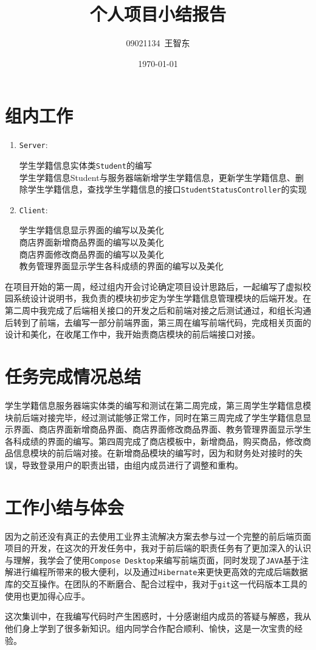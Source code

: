 \documentclass{article}
\title{个人项目小结报告}
\author{09021134~王智东}
\date{\today}
\begin{document}
\maketitle

\section{组内工作}
\begin{enumerate}
\item
    \texttt{Server}:
    
        学生学籍信息实体类\texttt{Student}的编写\\
        学生学籍信息Student与服务器端新增学生学籍信息，更新学生学籍信息、删除学生学籍信息，查找学生学籍信息的接口\texttt{StudentStatusController}的实现

\item 
    \texttt{Client}:
    
    
    学生学籍信息显示界面的编写以及美化\\
    商店界面新增商品界面的编写以及美化\\
    商店界面修改商品界面的编写以及美化\\
    教务管理界面显示学生各科成绩的界面的编写以及美化
\end{enumerate}

  在项目开始的第一周，经过组内开会讨论确定项目设计思路后，一起编写了虚拟校园系统设计说明书，我负责的模块初步定为学生学籍信息管理模块的后端开发。在第二周中我完成了后端相关接口的开发之后和前端对接之后测试通过，和组长沟通后转到了前端，去编写一部分前端界面，第三周在编写前端代码，完成相关页面的设计和美化，在收尾工作中，我开始责商店模块的前后端接口对接。
\section{任务完成情况总结}

    学生学籍信息服务器端实体类的编写和测试在第二周完成，第三周学生学籍信息模块前后端对接完毕，经过测试能够正常工作，同时在第三周完成了学生学籍信息显示界面、商店界面新增商品界面、商店界面修改商品界面、教务管理界面显示学生各科成绩的界面的编写。第四周完成了商店模板中，新增商品，购买商品，修改商品信息模块的前后端对接。在新增商品模块的编写时，因为和财务处对接时的失误，导致登录用户的职责出错，由组内成员进行了调整和重构。

\section{工作小结与体会}


    因为之前还没有真正的去使用工业界主流解决方案去参与过一个完整的前后端页面项目的开发，在这次的开发任务中，我对于前后端的职责任务有了更加深入的认识与理解，我学会了使用\texttt{Compose Desktop}来编写前端页面，同时发现了\texttt{JAVA}基于注解进行编程所带来的极大便利，以及通过\texttt{Hibernate}来更快更高效的完成后端数据库的交互操作。在团队的不断磨合、配合过程中，我对于\texttt{git}这一代码版本工具的使用也更加得心应手。

    这次集训中，在我编写代码时产生困惑时，十分感谢组内成员的答疑与解惑，我从他们身上学到了很多新知识。组内同学合作配合顺利、愉快，这是一次宝贵的经验。
\end{document}

